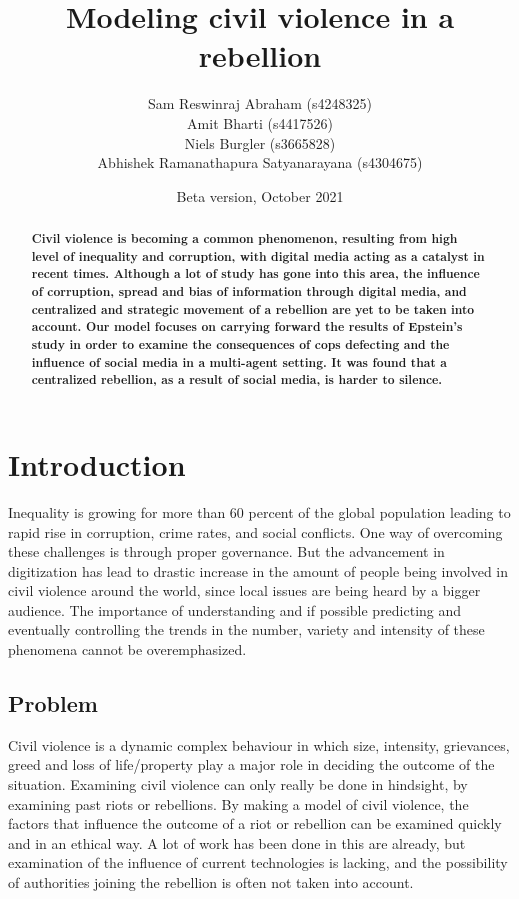 \documentclass[a4paper,11pt]{article}
\title{Modeling civil violence in a rebellion}
\author{
  Sam Reswinraj Abraham (s4248325)
  \\
  Amit Bharti (s4417526)
  \\
  Niels Burgler (s3665828)
  \\
  Abhishek Ramanathapura Satyanarayana (s4304675)
}
\date{Beta version, October 2021} %
\begin{document}
\maketitle

\begin{abstract}
\textbf{Civil violence is becoming a common phenomenon, resulting from high level of inequality and corruption, with digital media acting as a catalyst in recent times. Although a lot of study has gone into this area, the influence of corruption, spread and bias of information through digital media, and centralized and strategic movement of a rebellion are yet to be taken into account. Our model focuses on carrying forward the results of Epstein's \cite{epstein2002modeling} study in order to examine the consequences of cops defecting and the influence of social media in a multi-agent setting. It was found that a centralized rebellion, as a result of social media, is harder to silence.}  
\end{abstract}

\section{Introduction}
Inequality is growing for more than 60 percent of the global population leading to rapid rise in corruption, crime rates, and social conflicts. One way of overcoming these challenges is through proper governance. But the advancement in digitization has lead to drastic increase in the amount of people being involved in civil violence around the world, since local issues are being heard by a bigger audience. The importance of understanding and if possible predicting and eventually controlling the trends in the number, variety and intensity of these phenomena cannot be overemphasized.

\subsection{Problem}
Civil violence is a dynamic complex behaviour in which size, intensity, grievances, greed and loss of life/property play a major role in deciding the outcome of the situation. Examining civil violence can only really be done in hindsight, by examining past riots or rebellions. By making a model of civil violence, the factors that influence the outcome of a riot or rebellion can be examined quickly and in an ethical way. A lot of work has been done in this are already, but examination of the influence of current technologies is lacking, and the possibility of authorities joining the rebellion is often not taken into account.
\end{document}
